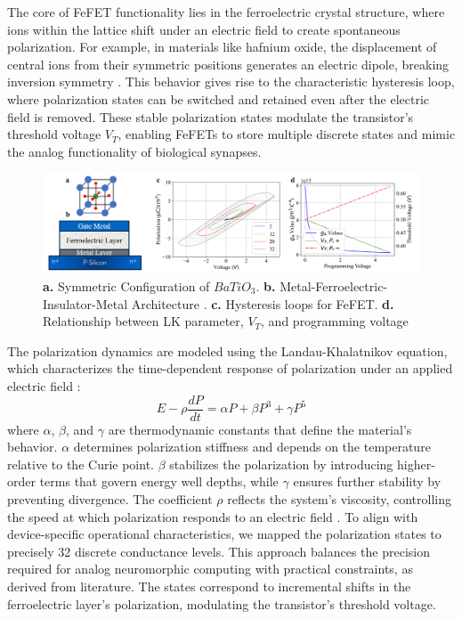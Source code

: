 \documentclass[conference]{IEEEtran}
\begin{document}
The core of FeFET functionality lies in the ferroelectric crystal structure, where ions within the lattice shift under an electric field to create spontaneous polarization. For example, in materials like hafnium oxide, the displacement of central ions from their symmetric positions generates an electric dipole, breaking inversion symmetry \cite{zagni_reliability_2023}. This behavior gives rise to the characteristic hysteresis loop, where polarization states can be switched and retained even after the electric field is removed. These stable polarization states modulate the transistor's threshold voltage $V_T$, enabling FeFETs to store multiple discrete states and mimic the analog functionality of biological synapses. 
\begin{figure}
    \centering
    \includegraphics[width=1\linewidth]{Screenshot 2024-12-10 001037.png}
    \caption{\textbf{a.} Symmetric Configuration of $BaTiO_{3}$. \textbf{b.} Metal-Ferroelectric-Insulator-Metal Architecture \cite{wang_fefet-based_2023}. \textbf{c.} Hysteresis loops for FeFET. \textbf{d.} Relationship between LK parameter, $V_T$, and programming voltage}
    \label{fig:fefet}
\end{figure}
The polarization dynamics are  modeled using the Landau-Khalatnikov equation, which characterizes the time-dependent response of polarization under an applied electric field \cite{aziz_physics-based_2016}: 
\begin{equation}
\label{lankha}
E - \rho \frac{dP}{dt} = \alpha P + \beta P^3 + \gamma P^5
\end{equation}
where $\alpha$, $\beta$, and $\gamma$ are thermodynamic constants that define the material's behavior. $\alpha$ determines polarization stiffness and depends on the temperature relative to the Curie point. $\beta$ stabilizes the polarization by introducing higher-order terms that govern energy well depths, while $\gamma$ ensures further stability by preventing divergence. The coefficient $\rho$ reflects the system's viscosity, controlling the speed at which polarization responds to an electric field \cite{maslovskaya_theoretical_2021}. 
To align with device-specific operational characteristics, we mapped the polarization states to precisely 32 discrete conductance levels. This approach balances the precision required for analog neuromorphic computing with practical constraints, as derived from literature\cite{jerry_ferroelectric_2017}. The states correspond to incremental shifts in the ferroelectric layer's polarization, modulating the transistor's threshold voltage. 
\end{document}
